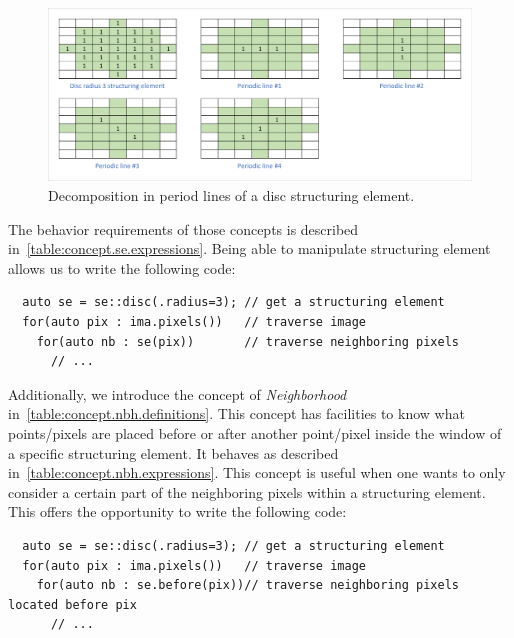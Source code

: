 \begin{figure}[htbp]
  \centering
  \includegraphics[width=.8\linewidth]{../figures/disc_se_decomp}
  \caption{Decomposition in period lines of a disc structuring element.}
  \label{fig:se.decomp.disc}
\end{figure}

%
%
%
%
%
%

The behavior requirements of those concepts is described in~\cref{table:concept.se.expressions}. Being able to
manipulate structuring element allows us to write the following code:
\begin{verbatim}
  auto se = se::disc(.radius=3); // get a structuring element
  for(auto pix : ima.pixels())   // traverse image
    for(auto nb : se(pix))       // traverse neighboring pixels
      // ...
\end{verbatim}

Additionally, we introduce the concept of \emph{Neighborhood} in~\cref{table:concept.nbh.definitions}. This concept has
facilities to know what points/pixels are placed before or after another point/pixel inside the window of a specific
structuring element. It behaves as described in~\cref{table:concept.nbh.expressions}. This concept is useful when one
wants to only consider a certain part of the neighboring pixels within a structuring element. This offers the
opportunity to write the following code:
\begin{verbatim}
  auto se = se::disc(.radius=3); // get a structuring element
  for(auto pix : ima.pixels())   // traverse image
    for(auto nb : se.before(pix))// traverse neighboring pixels located before pix
      // ...
\end{verbatim}

